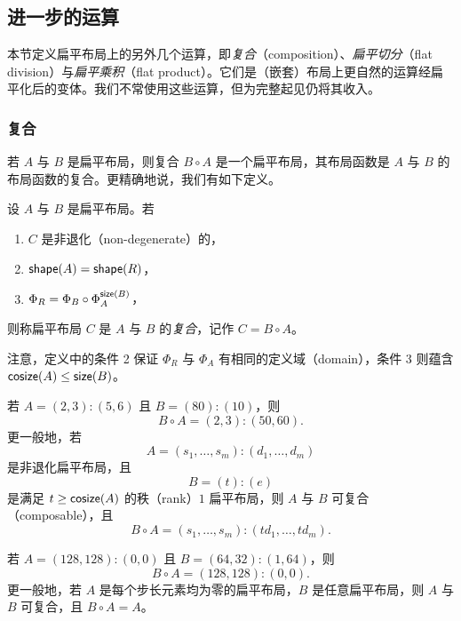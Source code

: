\subsection{进一步的运算}

本节定义扁平布局上的另外几个运算，即{\it 复合}（composition）、{\it 扁平切分}（flat division）与{\it 扁平乘积}（flat product）。它们是（嵌套）布局上更自然的运算经扁平化后的变体。我们不常使用这些运算，但为完整起见仍将其收入。

\subsubsection{复合}
若 $A$ 与 $B$ 是扁平布局，则复合 $B \circ A$ 是一个扁平布局，其布局函数是 $A$ 与 $B$ 的布局函数的复合。更精确地说，我们有如下定义。

\begin{definition}\label{definitionofflatlayoutcomposition} 设 $A$ 与 $B$ 是扁平布局。若
    \begin{enumerate}
    \item $C$ 是非退化（non-degenerate）的，
    \item $\mathsf{shape}(A) = \mathsf{shape}(R)$，
    \item $\Phi_R = \Phi_B \circ \Phi_A^{\mathsf{size}(B)}$，
    \end{enumerate}
则称扁平布局 $C$ 是 $A$ 与 $B$ 的{\it 复合}，记作 $C = B \circ A$。
\end{definition}

\begin{remark}
    注意，定义中的条件 2 保证 $\Phi_R$ 与 $\Phi_A$ 有相同的定义域（domain），条件 3 则蕴含 $\mathsf{cosize}(A) \leq \mathsf{size}(B)$。
\end{remark}

\begin{example}\label{flatcompositionexample1}
若 $A = (2,3):(5,6)$ 且 $B = (80):(10)$，则
\[
B \circ A = (2,3):(50,60).
\]
更一般地，若
\[
A = (s_1,\dots,s_m):(d_1,\dots,d_m)
\]
是非退化扁平布局，且
\[
B = (t):(e)
\]
是满足 $t \geq \mathsf{cosize}(A)$ 的秩（rank）$1$ 扁平布局，则 $A$ 与 $B$ 可复合（composable），且
\[
B \circ A = (s_1,\dots,s_m):(td_1,\dots,td_m).
\]
\end{example}

\begin{example}
    若 $A = (128,128):(0,0)$ 且 $B = (64,32):(1,64)$，则
    \[
    B \circ A = (128,128):(0,0).
    \]
    更一般地，若 $A$ 是每个步长元素均为零的扁平布局，$B$ 是任意扁平布局，则 $A$ 与 $B$ 可复合，且 $B \circ A = A$。
\end{example}

